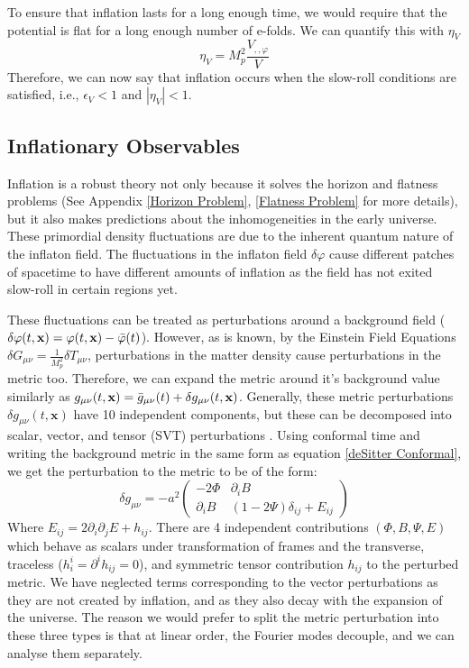 \documentclass[aps,prd,reprint,preprintnumbers,showpacs,floatfix,nofootinbib,superscript address]{revtex4-2}
\begin{document}
To ensure that inflation lasts for a long enough time, we would require that the potential is flat for a long enough number of e-folds. We can quantify this with $\eta_V$
\begin{equation}
    \eta_V = M_p^2  \frac{V_{,,\varphi}}{V} 
\end{equation}
Therefore, we can now say that inflation occurs when the slow-roll conditions are satisfied, i.e., $\epsilon_V < 1$ and $|\eta_V|< 1$.
\subsection{Inflationary Observables} \label{Inflationary Observables}
Inflation is a robust theory not only because it solves the horizon and flatness problems (See Appendix \ref{Horizon Problem}, \ref{Flatness Problem} for more details), but it also makes predictions about the inhomogeneities in the early universe. These primordial density fluctuations are due to the inherent quantum nature of the inflaton field. 
The fluctuations in the inflaton field $\delta\varphi$ cause different patches of spacetime to have different amounts of inflation as the field has not exited slow-roll in certain regions yet. 

These fluctuations can be treated as perturbations around a background field ($\delta\varphi(t,\textbf{x}) = \varphi(t,\textbf{x}) - \Bar{\varphi}(t)$). However, as is known, by the Einstein Field Equations $\delta G_{\mu\nu} = \frac{1}{M_p^2}\delta T_{\mu \nu}$, perturbations in the matter density cause perturbations in the metric too. Therefore, we can expand the metric around it's background value similarly as $g_{\mu\nu}(t,\textbf{x}) = \Bar{g}_{\mu\nu}(t) + \delta g_{\mu\nu}(t,\textbf{x})$. Generally, these metric perturbations $\delta g_{\mu\nu}(t,\textbf{x})$ have 10 independent components, but these can be decomposed into scalar, vector, and tensor (SVT) perturbations \cite{liddle_cosmological_2000, malik_cosmological_2009}. Using conformal time and writing the background metric in the same form as equation \ref{deSitter Conformal}, we get the perturbation to the metric to be of the form:
\begin{equation} \label{Perturbed metric}
    \delta g_{\mu\nu}
    = 
    -a^2
    \begin{pmatrix}
        -2 \Phi & \partial_iB \\
        \partial_iB & (1-2\Psi)\delta_{ij} + E_{ij} 
    \end{pmatrix}
\end{equation}
Where $E_{ij} = 2\partial_i\partial_j E + h_{ij}$. There are 4 independent contributions $(\Phi, B, \Psi, E)$ which behave as scalars under transformation of frames and the transverse, traceless ($h_i^i = \partial^ih_{ij} = 0$), and symmetric tensor contribution $h_{ij}$ to the perturbed metric. We have neglected terms corresponding to the vector perturbations as they are not created by inflation, and as they also decay with the expansion of the universe. The reason we would prefer to split the metric perturbation into these three types is that at linear order, the Fourier modes decouple, and we can analyse them separately. 
\end{document}
